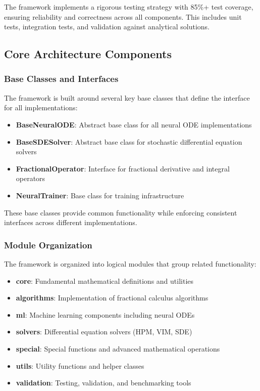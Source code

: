 The framework implements a rigorous testing strategy with 85\%+ test coverage, ensuring reliability and correctness across all components. This includes unit tests, integration tests, and validation against analytical solutions.

\subsection{Core Architecture Components}

\subsubsection{Base Classes and Interfaces}

The framework is built around several key base classes that define the interface for all implementations:

\begin{itemize}
    \item \textbf{BaseNeuralODE}: Abstract base class for all neural ODE implementations
    \item \textbf{BaseSDESolver}: Abstract base class for stochastic differential equation solvers
    \item \textbf{FractionalOperator}: Interface for fractional derivative and integral operators
    \item \textbf{NeuralTrainer}: Base class for training infrastructure
\end{itemize}

These base classes provide common functionality while enforcing consistent interfaces across different implementations.

\subsubsection{Module Organization}

The framework is organized into logical modules that group related functionality:

\begin{itemize}
    \item \textbf{core}: Fundamental mathematical definitions and utilities
    \item \textbf{algorithms}: Implementation of fractional calculus algorithms
    \item \textbf{ml}: Machine learning components including neural ODEs
    \item \textbf{solvers}: Differential equation solvers (HPM, VIM, SDE)
    \item \textbf{special}: Special functions and advanced mathematical operations
    \item \textbf{utils}: Utility functions and helper classes
    \item \textbf{validation}: Testing, validation, and benchmarking tools
\end{itemize}

